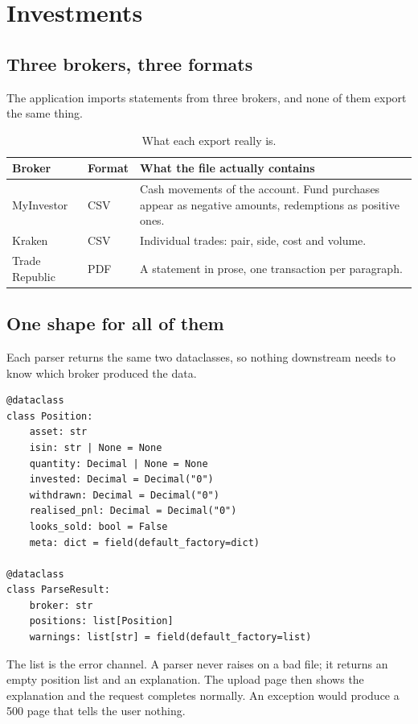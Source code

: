 \chapter{Investments}

\section{Three brokers, three formats}

The application imports statements from three brokers, and none of them export
the same thing.

\begin{table}[h]
\centering
\begin{tabular}{@{}p{3.2cm}p{2.4cm}p{7.9cm}@{}}
\toprule
\textbf{Broker} & \textbf{Format} & \textbf{What the file actually contains} \\
\midrule
MyInvestor & CSV & Cash movements of the account. Fund purchases appear as
negative amounts, redemptions as positive ones. \\
Kraken & CSV & Individual trades: pair, side, cost and volume. \\
Trade Republic & PDF & A statement in prose, one transaction per paragraph. \\
\bottomrule
\end{tabular}
\caption{What each export really is.}
\end{table}

\section{One shape for all of them}

Each parser returns the same two dataclasses, so nothing downstream needs to know
which broker produced the data.

\begin{lstlisting}[style=py]
@dataclass
class Position:
    asset: str
    isin: str | None = None
    quantity: Decimal | None = None
    invested: Decimal = Decimal("0")
    withdrawn: Decimal = Decimal("0")
    realised_pnl: Decimal = Decimal("0")
    looks_sold: bool = False
    meta: dict = field(default_factory=dict)

@dataclass
class ParseResult:
    broker: str
    positions: list[Position]
    warnings: list[str] = field(default_factory=list)
\end{lstlisting}

The  list is the error channel. A parser never raises on a bad
file; it returns an empty position list and an explanation. The upload page then
shows the explanation and the request completes normally. An exception would
produce a 500 page that tells the user nothing.

